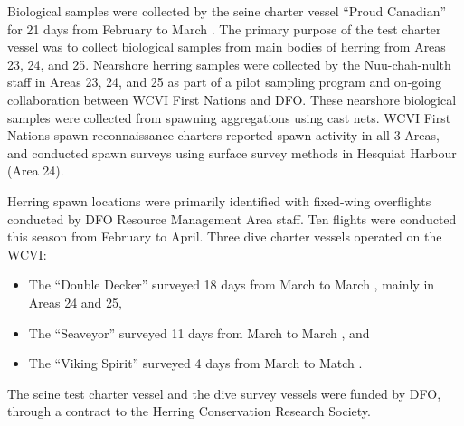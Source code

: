 Biological samples were collected by the seine charter vessel ``Proud Canadian'' for 21 days from February  to March .
The primary purpose of the test charter vessel was to collect biological samples from main bodies of herring from Areas 23, 24, and 25.
Nearshore herring samples were collected by the Nuu-chah-nulth staff in Areas 23, 24, and 25 as part of a pilot sampling program and on-going collaboration between WCVI First Nations and DFO.
These nearshore biological samples were collected from spawning aggregations using cast nets.
WCVI First Nations spawn reconnaissance charters reported spawn activity in all 3 Areas, and conducted spawn surveys using surface survey methods in Hesquiat Harbour (Area 24).

Herring spawn locations were primarily identified with fixed-wing overflights conducted by DFO Resource Management Area staff.
Ten flights were conducted this season from February to April.
Three dive charter vessels operated on the WCVI:
\begin{itemize}
\item The ``Double Decker'' surveyed 18 days from March  to March , mainly in Areas 24 and 25,
\item The ``Seaveyor'' surveyed 11 days from March  to March , and
\item The ``Viking Spirit'' surveyed 4 days from March  to Match .
\end{itemize}
The seine test charter vessel and the dive survey vessels were funded by DFO, through a contract to the Herring Conservation Research Society.

